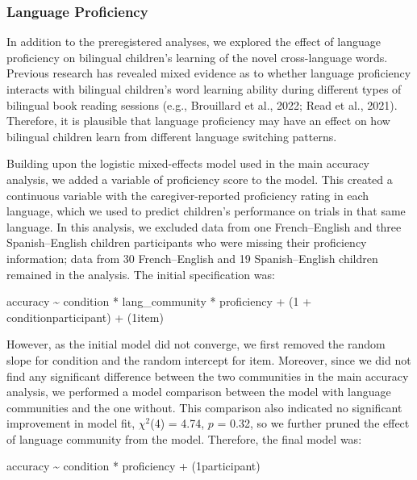 \documentclass[
  man,floatsintext]{apa7}
\begin{document}
\hypertarget{language-proficiency}{%
\subsubsection{Language Proficiency}\label{language-proficiency}}

In addition to the preregistered analyses, we explored the effect of language proficiency on bilingual children's learning of the novel cross-language words. Previous research has revealed mixed evidence as to whether language proficiency interacts with bilingual children's word learning ability during different types of bilingual book reading sessions (e.g., Brouillard et al., 2022; Read et al., 2021). Therefore, it is plausible that language proficiency may have an effect on how bilingual children learn from different language switching patterns.

Building upon the logistic mixed-effects model used in the main accuracy analysis, we added a variable of proficiency score to the model. This created a continuous variable with the caregiver-reported proficiency rating in each language, which we used to predict children's performance on trials in that same language. In this analysis, we excluded data from one French--English and three Spanish--English children participants who were missing their proficiency information; data from 30 French--English and 19 Spanish--English children remained in the analysis. The initial specification was:

accuracy \textasciitilde{} condition * lang\_community * proficiency + (1 + condition\textbar participant) + (1\textbar item)

However, as the initial model did not converge, we first removed the random slope for condition and the random intercept for item. Moreover, since we did not find any significant difference between the two communities in the main accuracy analysis, we performed a model comparison between the model with language communities and the one without. This comparison also indicated no significant improvement in model fit, \(\chi^2\)(4) = 4.74, \(p\) = 0.32, so we further pruned the effect of language community from the model. Therefore, the final model was:

accuracy \textasciitilde{} condition * proficiency + (1\textbar participant)
\end{document}
